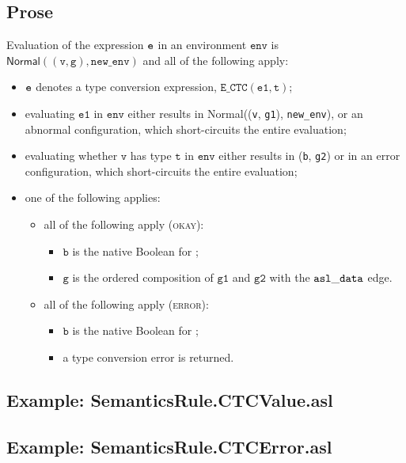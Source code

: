 \documentclass{book}
\newcommand\ProseOrAbnormal[0]{or an abnormal configuration, which short-circuits the entire evaluation}
\newcommand\Normal[0]{\textsf{Normal}}
\newcommand\newenv[0]{\texttt{new\_env}}
\newcommand\env[0]{\texttt{env}}
\newcommand\vg[0]{\texttt{g}}
\newcommand\vv[0]{\texttt{v}}
\newcommand\vt[0]{\texttt{t}}
\newcommand\veone[0]{\texttt{e1}}
\newcommand\vgone[0]{\texttt{g1}}
\newcommand\vgtwo[0]{\texttt{g2}}
\newcommand\vb[0]{\texttt{b}}
\begin{document}
  \subsection{Prose}
  Evaluation of the expression $\texttt{e}$ in an environment $\env$ is \\
  $\Normal((\vv, \vg), \newenv)$ and all of the following apply:
  \begin{itemize}
  \item $\texttt{e}$ denotes a type conversion expression, $\texttt{E\_CTC}(\veone, \vt)$;
  \item evaluating $\veone$ in $\env$ either results in \Normal((\vv, \vgone), \newenv),
  \ProseOrAbnormal;
  \item evaluating whether $\vv$ has type $\vt$ in $\env$ either results in (\vb, \vgtwo)
  or in an error configuration, which short-circuits the entire evaluation;
  \item one of the following applies:
        \begin{itemize}
        \item all of the following apply (\textsc{okay}):
              \begin{itemize}
              \item $\vb$ is the native Boolean for \True;
              \item $\vg$ is the ordered composition of $\vgone$ and $\vgtwo$ with the $\mathtt{asl\_data}$ edge.
              \end{itemize}
        \item all of the following apply (\textsc{error}):
              \begin{itemize}
              \item $\vb$ is the native Boolean for \True;
              \item a type conversion error is returned.
              \end{itemize}
        \end{itemize}
  \end{itemize}

  \subsection{Example: SemanticsRule.CTCValue.asl}

  \subsection{Example: SemanticsRule.CTCError.asl}
\end{document}

